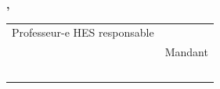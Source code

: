 \begin{titlepage}
\begin{center}
{{{				%
				\textbf{\Month, \Year}}\\[49pt]
				
				{
					\begin{tabular*}{16cm}{>{\centering}m{7.59cm}>{\centering}m{7.58cm}}
						Professeur-e HES responsable\\[13pt]
						\textbf{ \Professor }
						&
						Mandant\\[12pt]
						\textbf{ \Client }
					\end{tabular*}
				}
			}
			\vfill
		}%
	\end{center}
\end{titlepage}
\addtocounter{page}{1}
